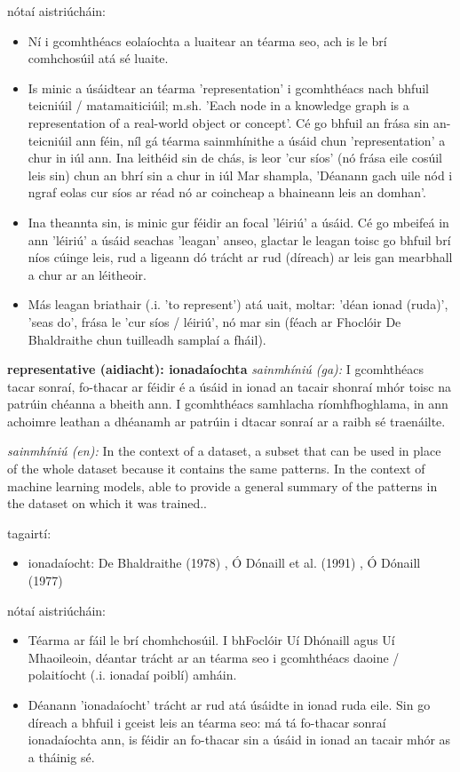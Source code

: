 \documentclass{article}
\begin{document}
nótaí aistriúcháin:
\begin{itemize}
	\item Ní i gcomhthéacs eolaíochta a luaitear an téarma seo, ach is le brí comhchosúil atá sé luaite.
	\item Is minic a úsáidtear an téarma 'representation' i gcomhthéacs nach bhfuil teicniúil / matamaiticiúil; m.sh. 'Each node in a knowledge graph is a representation of a real-world object or concept'. Cé go bhfuil an frása sin an-teicniúil ann féin, níl gá téarma sainmhínithe a úsáid chun 'representation' a chur in iúl ann. Ina leithéid sin de chás, is leor 'cur síos' (nó frása eile cosúil leis sin) chun an bhrí sin a chur in iúl Mar shampla, 'Déanann gach uile nód i ngraf eolas cur síos ar réad nó ar coincheap a bhaineann leis an domhan'.
	\item Ina theannta sin, is minic gur féidir an focal 'léiriú' a úsáid. Cé go mbeifeá in ann 'léiriú' a úsáid seachas 'leagan' anseo, glactar le leagan toisc go bhfuil brí níos cúinge leis, rud a ligeann dó trácht ar rud (díreach) ar leis gan mearbhall a chur ar an léitheoir.
	\item Más leagan briathair (.i. 'to represent') atá uait, moltar: 'déan ionad (ruda)', 'seas do', frása le 'cur síos / léiriú', nó mar sin (féach ar Fhoclóir De Bhaldraithe chun tuilleadh samplaí a fháil).
\end{itemize}


\textbf{representative (aidiacht): ionadaíochta}
\textit{sainmhíniú (ga):} I gcomhthéacs tacar sonraí, fo-thacar ar féidir é a úsáid in ionad an tacair shonraí mhór toisc na patrúin chéanna a bheith ann. I gcomhthéacs samhlacha ríomhfhoghlama, in ann achoimre leathan a dhéanamh ar patrúin i dtacar sonraí ar a raibh sé traenáilte.

\textit{sainmhíniú (en):} In the context of a dataset, a subset that can be used in place of the whole dataset because it contains the same patterns. In the context of machine learning models, able to provide a general summary of the patterns in the dataset on which it was trained..

tagairtí:
\begin{itemize}
	\item ionadaíocht: De Bhaldraithe (1978) \cite{de-bhaldraithe}, Ó Dónaill et al. (1991) \cite{focloir-beag}, Ó Dónaill (1977) \cite{odonaill}
\end{itemize}

nótaí aistriúcháin:
\begin{itemize}
	\item Téarma ar fáil le brí chomhchosúil. I bhFoclóir Uí Dhónaill agus Uí Mhaoileoin, déantar trácht ar an téarma seo i gcomhthéacs daoine / polaitíocht (.i. ionadaí poiblí) amháin.
	\item Déanann 'ionadaíocht' trácht ar rud atá úsáidte in ionad ruda eile. Sin go díreach a bhfuil i gceist leis an téarma seo: má tá fo-thacar sonraí ionadaíochta ann, is féidir an fo-thacar sin a úsáid in ionad an tacair mhór as a tháinig sé.
\end{itemize}
\end{document}
